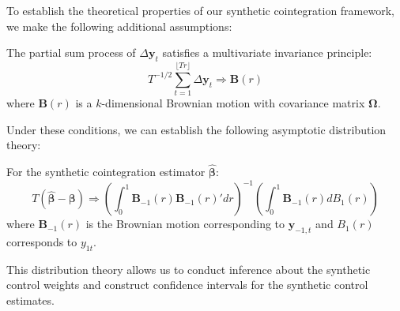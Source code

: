 To establish the theoretical properties of our synthetic cointegration framework, we make the following additional assumptions:

\begin{assumption}
The partial sum process of $\Delta \mathbf{y}_t$ satisfies a multivariate invariance principle:
\begin{equation}
T^{-1/2}\sum_{t=1}^{\lfloor Tr \rfloor} \Delta \mathbf{y}_t \Rightarrow \mathbf{B}(r)
\end{equation}
where $\mathbf{B}(r)$ is a $k$-dimensional Brownian motion with covariance matrix $\boldsymbol{\Omega}$.
\end{assumption}

Under these conditions, we can establish the following asymptotic distribution theory:

\begin{theorem}
For the synthetic cointegration estimator $\hat{\boldsymbol{\beta}}$:
\begin{equation}
T(\hat{\boldsymbol{\beta}} - \boldsymbol{\beta}) \Rightarrow \left(\int_0^1 \mathbf{B}_{-1}(r)\mathbf{B}_{-1}(r)' dr\right)^{-1}\left(\int_0^1 \mathbf{B}_{-1}(r)dB_1(r)\right)
\end{equation}
where $\mathbf{B}_{-1}(r)$ is the Brownian motion corresponding to $\mathbf{y}_{-1,t}$ and $B_1(r)$ corresponds to $y_{1t}$.
\end{theorem}

This distribution theory allows us to conduct inference about the synthetic control weights and construct confidence intervals for the synthetic control estimates.
